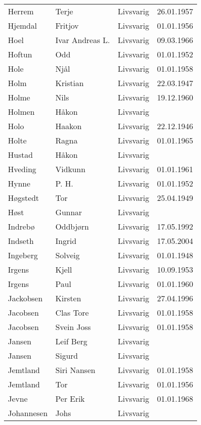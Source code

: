 \begin{longtable}{llll}
        Herrem	&	Terje	&	Livsvarig 	&	26.01.1957	\\
        Hjemdal	&	Fritjov	&	Livsvarig 	&	01.01.1956	\\
        Hoel	&	Ivar Andreas L.	&	Livsvarig 	&	09.03.1966	\\
        Hoftun	&	Odd	&	Livsvarig 	&	01.01.1952	\\
        Hole	&	Njål	&	Livsvarig 	&	01.01.1958	\\
        Holm	&	Kristian	&	Livsvarig 	&	22.03.1947	\\
        Holme	&	Nils	&	Livsvarig 	&	19.12.1960	\\
        Holmen	&	Håkon	&	Livsvarig 	&		\\
        Holo	&	Haakon	&	Livsvarig 	&	22.12.1946	\\
        Holte	&	Ragna	&	Livsvarig 	&	01.01.1965	\\
        Hustad	&	Håkon	&	Livsvarig 	&		\\
        Hveding	&	Vidkunn	&	Livsvarig 	&	01.01.1961	\\
        Hynne	&	P. H. 	&	Livsvarig 	&	01.01.1952	\\
        Høgstedt	&	Tor	&	Livsvarig 	&	25.04.1949	\\
        Høst	&	Gunnar	&	Livsvarig 	&		\\
        Indrebø	&	Oddbjørn	&	Livsvarig 	&	17.05.1992	\\
        Indseth 	&	Ingrid	&	Livsvarig	&	17.05.2004	\\
        Ingeberg	&	Solveig	&	Livsvarig 	&	01.01.1948	\\
        Irgens	&	Kjell	&	Livsvarig 	&	10.09.1953	\\
        Irgens	&	Paul	&	Livsvarig 	&	01.01.1960	\\
        Jackobsen 	&	Kirsten	&	Livsvarig	&	27.04.1996	\\
        Jacobsen	&	Clas Tore	&	Livsvarig 	&	01.01.1958	\\
        Jacobsen	&	Svein Joss	&	Livsvarig 	&	01.01.1958	\\
        Jansen	&	Leif Berg	&	Livsvarig 	&		\\
        Jansen	&	Sigurd	&	Livsvarig 	&		\\
        Jemtland	&	Siri Nansen	&	Livsvarig 	&	01.01.1958	\\
        Jemtland	&	Tor	&	Livsvarig 	&	01.01.1956	\\
        Jevne	&	Per Erik	&	Livsvarig 	&	01.01.1968	\\
        Johannesen	&	Johs	&	Livsvarig 	&		\\

\end{longtable}
